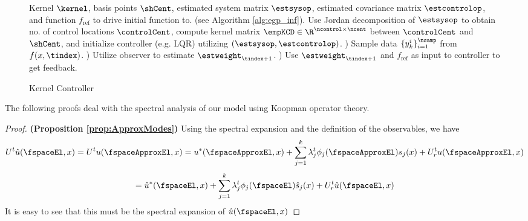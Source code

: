 \begin{figure}[tbh]
 \begin{algorithm}[H]
   \caption{Kernel Controller}
   \label{alg:egp_control}
\begin{algorithmic}
\begin{footnotesize}
    Kernel $\kernel$, basis points $\shCent$,
   estimated system matrix $\estsysop$, estimated covariance matrix $\estcontrolop$, and function $f_{\text{ref}}$ 
   to drive initial function to.    
    (see Algorithm \ref{alg:egp_inf}). 
    Use Jordan decomposition of $\estsysop$ to obtain  no. of control locations $\controlCent$, compute kernel matrix $\empKCD\in\R^{\ncontrol\times\ncent}$ between $\controlCent$ and $\shCent$, and initialize controller (e.g. LQR) utilizing $(\estsysop, \estcontrolop)$.
     ) Sample data $\{y^i_k\}_{i=1}^{\nsamp}$ from $f(x,\tindex)$.    
     ) Utilize observer to estimate $\estweight_{\tindex+1}$.
     ) Use $\estweight_{\tindex+1}$ and $f_{\text{ref}}$ as input to controller to get feedback. 
   \ENDWHILE   
\end{footnotesize}
\end{algorithmic}
\end{algorithm}
\vspace{-0.2in}
\end{figure}



The following proofs deal with the spectral analysis of our model using Koopman operator theory.
\begin{proof}
	\textbf{(Proposition \ref{prop:ApproxModes})} Using the spectral expansion and the definition of the observables, we have
	$$U^t \hat u(\fspaceEl,x) = U^t u(\fspaceApproxEl,x) = u^{\ast}(\fspaceApproxEl,x) + \sum_{j=1}^k \lambda_j^t \phi_j(\fspaceApproxEl) s_j (x)  +  U_r^t u(\fspaceApproxEl,x)$$
	$$ = \hat u^{\ast}(\fspaceEl,x) + \sum_{j=1}^k \lambda_j^t \phi_j(\fspaceEl) \hat s_j (x)  +  U_r^t \hat u(\fspaceEl,x) $$
	It is easy to see that this must be the spectral expansion of $\hat u(\fspaceEl,x)$
\end{proof}

